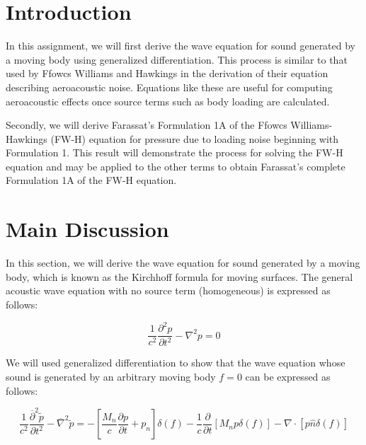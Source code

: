 \documentclass[]{aiaa-tc}%
\begin{document}
\section{Introduction} %

In this assignment, we will first derive the wave equation for sound generated by a moving body using generalized differentiation.  This process is similar to that used by Ffowcs Williams and Hawkings in the derivation of their equation describing aeroacoustic noise.  Equations like these are useful for computing aeroacoustic effects once source terms such as body loading are calculated.

Secondly, we will derive Farassat's Formulation 1A of the Ffowcs Williams-Hawkings (FW-H) equation for pressure due to loading noise beginning with Formulation 1.  This result will demonstrate the process for solving the FW-H equation and may be applied to the other terms to obtain Farassat's complete Formulation 1A of the FW-H equation.





\section{Main Discussion}

In this section, we will derive the wave equation for sound generated by a moving body, which is known as the Kirchhoff formula for moving surfaces.  The general acoustic wave equation with no source term (homogeneous) is expressed as follows:

\begin{equation} \label{AcousticWaveHomo}
\boxed{\dfrac{1}{c^2}\dfrac{\partial^2p}{\partial t^2} - \nabla^2p = 0}
\end{equation}

We will used generalized differentiation to show that the wave equation whose sound is generated by an arbitrary moving body $f=0$ can be expressed as follows:

\begin{equation} \label{AcousticWaveBody}
\boxed{\dfrac{1}{c^2}\dfrac{ \overline{\partial}^2\widetilde{p}}{\partial t^2}
    - \overline{\nabla}^2 \widetilde{p}
= -\left[ \dfrac{M_n}{c} \dfrac{\partial p}{\partial t} + p_n \right] \delta(f)
    -\dfrac{1}{c} \dfrac{\partial}{\partial t} \left[ M_n p \delta(f) \right]
    -\nabla \cdot \left[ p \hat{n} \delta(f) \right]}
\end{equation}
\end{document}
